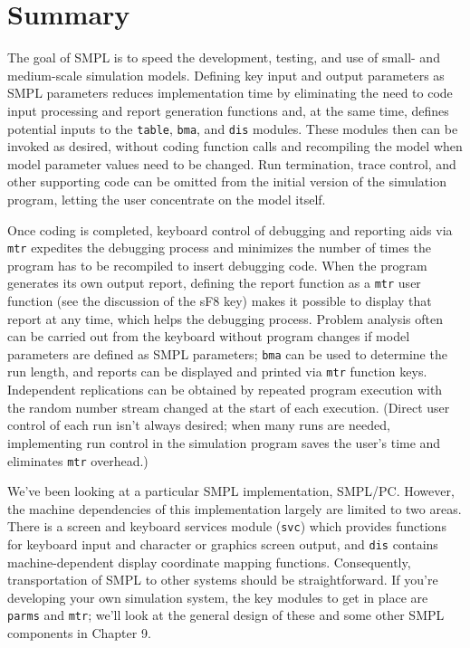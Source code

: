 \section{Summary}
\label{sec:simenv-summary}

The goal of SMPL is to speed the development, testing, and use of small-
and medium-scale simulation models. Defining key input and output
parameters as SMPL parameters reduces implementation time by eliminating
the need to code input processing and report generation functions and, at
the same time, defines potential inputs to the \texttt{table}, \texttt{bma}, and \texttt{dis} modules.
These modules then can be invoked as desired, without coding function calls
and recompiling the model when model parameter values need to be
changed. Run termination, trace control, and other supporting code can be
omitted from the initial version of the simulation program, letting the user
concentrate on the model itself.

Once coding is completed, keyboard control of debugging and reporting
aids via \texttt{mtr} expedites the debugging process and minimizes the number of
times the program has to be recompiled to insert debugging code. When the
program generates its own output report, defining the report function as a \texttt{mtr}
user function (see the discussion of the sF8 key) makes it possible to display
that report at any time, which helps the debugging process. Problem analysis
often can be carried out from the keyboard without program changes if
model parameters are defined as SMPL parameters; \texttt{bma} can be used to
determine the run length, and reports can be displayed and printed via \texttt{mtr}
function keys. Independent replications can be obtained by repeated program
execution with the random number stream changed at the start of each
execution. (Direct user control of each run isn't always desired; when many
runs are needed, implementing run control in the simulation program saves
the user's time and eliminates \texttt{mtr} overhead.)

We've been looking at a particular SMPL implementation, SMPL/PC.
However, the machine dependencies of this implementation largely are
limited to two areas. There is a screen and keyboard services module (\texttt{svc})
which provides functions for keyboard input and character or graphics screen
output, and \texttt{dis} contains machine-dependent display coordinate mapping
functions. Consequently, transportation of SMPL to other systems should be
straightforward. If you're developing your own simulation system, the key
modules to get in place are \texttt{parms} and \texttt{mtr}; we'll look at the general design of
these and some other SMPL components in Chapter 9.
